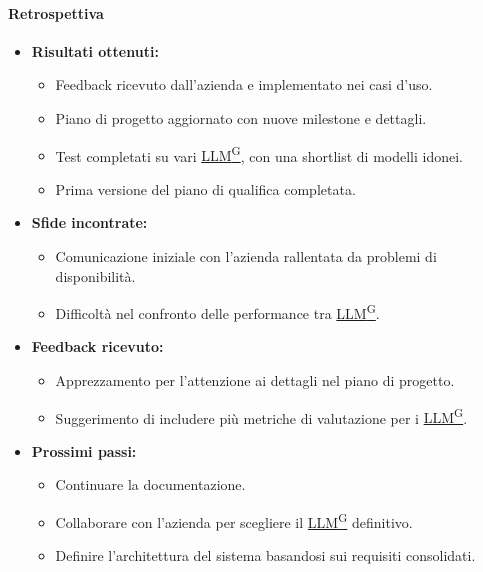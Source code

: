 \documentclass{article}
\begin{document}
                \paragraph{Retrospettiva}
                \begin{itemize}
                    \item \textbf{Risultati ottenuti:}
                    \begin{itemize}
                        \item Feedback ricevuto dall'azienda e implementato nei casi d'uso.
                        \item Piano di progetto aggiornato con nuove milestone e dettagli.
                        \item Test completati su vari \href{https://code7crusaders.github.io/docs/PB/documentazione_interna/glossario.html#llm-large-language-model}{LLM\textsuperscript{G}}, con una shortlist di modelli idonei.
                        \item Prima versione del piano di qualifica completata.
                    \end{itemize}
                    \item \textbf{Sfide incontrate:}
                    \begin{itemize}
                        \item Comunicazione iniziale con l'azienda rallentata da problemi di disponibilità.
                        \item Difficoltà nel confronto delle performance tra \href{https://code7crusaders.github.io/docs/PB/documentazione_interna/glossario.html#llm-large-language-model}{LLM\textsuperscript{G}}.
                    \end{itemize}
                    \item \textbf{Feedback ricevuto:}
                    \begin{itemize}
                        \item Apprezzamento per l'attenzione ai dettagli nel piano di progetto.
                        \item Suggerimento di includere più metriche di valutazione per i \href{https://code7crusaders.github.io/docs/PB/documentazione_interna/glossario.html#llm-large-language-model}{LLM\textsuperscript{G}}.
                    \end{itemize}
                    \item \textbf{Prossimi passi:}
                    \begin{itemize}
                        \item Continuare la documentazione.
                        \item Collaborare con l'azienda per scegliere il \href{https://code7crusaders.github.io/docs/PB/documentazione_interna/glossario.html#llm-large-language-model}{LLM\textsuperscript{G}} definitivo.
                        \item Definire l'architettura del sistema basandosi sui requisiti consolidati.
                    \end{itemize}
                \end{itemize}
\end{document}
